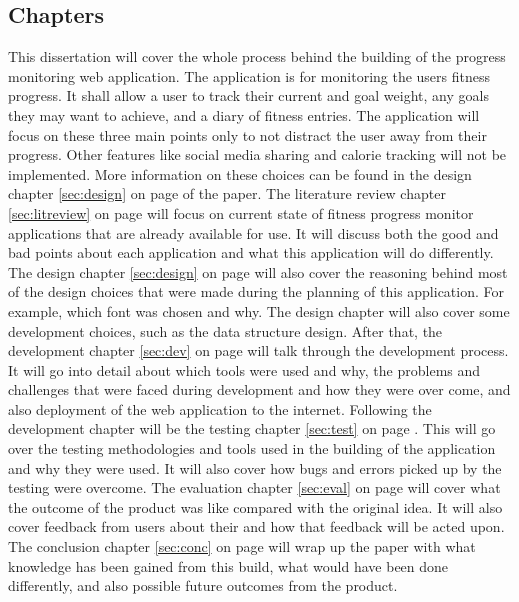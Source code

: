 \subsection{Chapters}
This dissertation will cover the whole process behind the building of the progress monitoring web application. The application is for monitoring the users fitness progress. It shall allow a user to track their current and goal weight, any goals they may want to achieve, and a diary of fitness entries. The application will focus on these three main points only to not distract the user away from their progress. Other features like social media sharing and calorie tracking will not be implemented. More information on these choices can be found in the design chapter \ref{sec:design} on page \pageref{sec:design} of the paper. The literature review chapter \ref{sec:litreview} on page \pageref{sec:litreview} will focus on current state of fitness progress monitor applications that are already available for use. It will discuss both the good and bad points about each application and what this application will do differently. The design chapter \ref{sec:design} on page \pageref{sec:design} will also cover the reasoning behind most of the design choices that were made during the planning of this application. For example, which font was chosen and why. The design chapter will also cover some development choices, such as the data structure design. After that, the development chapter \ref{sec:dev} on page \pageref{sec:dev} will talk through the development process. It will go into detail about which tools were used and why, the problems and challenges that were faced during development and how they were over come, and also deployment of the web application to the internet. Following the development chapter will be the testing chapter \ref{sec:test} on page \pageref{sec:test}. This will go over the testing methodologies and tools used in the building of the application and why they were used. It will also cover how bugs and errors picked up by the testing were overcome. The evaluation chapter \ref{sec:eval} on page \pageref{sec:eval} will cover what the outcome of the product was like compared with the original idea. It will also cover feedback from users about their and how that feedback will be acted upon. The conclusion chapter \ref{sec:conc} on page \pageref{sec:conc} will wrap up the paper with what knowledge has been gained from this build, what would have been done differently, and also possible future outcomes from the product.\\


